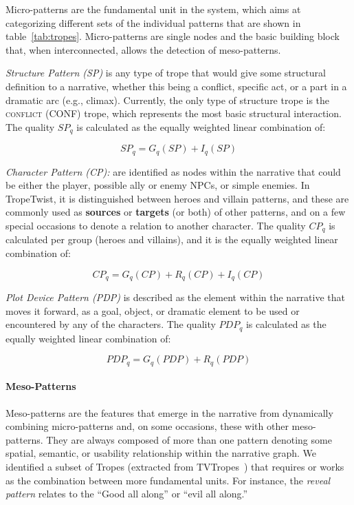 Micro-patterns are the fundamental unit in the system, which aims at categorizing different sets of the individual patterns that are shown in table~\ref{tab:tropes}. Micro-patterns are single nodes and the basic building block that, when interconnected, allows the detection of meso-patterns.

\emph{Structure Pattern (SP)} is any type of trope that would give some structural definition to a narrative, whether this being a conflict, specific act, or a part in a dramatic arc (e.g., climax). Currently, the only type of structure trope is the \textsc{conflict} (CONF) trope, which represents the most basic structural interaction. The quality $SP_{q}$ is calculated as the equally weighted linear combination of:

\begin{equation}
    SP_{q} = G_{q}(SP) + I_{q}(SP)
\end{equation}

\emph{Character Pattern (CP):} are identified as nodes within the narrative that could be either the player, possible ally or enemy NPCs, or simple enemies. In TropeTwist, it is distinguished between heroes and villain patterns, and these are commonly used as \textbf{sources} or \textbf{targets} (or both) of other patterns, and on a few special occasions to denote a relation to another character. The quality $CP_{q}$ is calculated per group (heroes and villains), and it is the equally weighted linear combination of:

\begin{equation}
    CP_{q} = G_{q}(CP) + R_{q}(CP) + I_{q}(CP)
\end{equation}

\emph{Plot Device Pattern (PDP)} is described as the element within the narrative that moves it forward, as a goal, object, or dramatic element to be used or encountered by any of the characters. The quality $PDP_{q}$ is calculated as the equally weighted linear combination of:

\begin{equation}
    PDP_{q} = G_{q}(PDP) + R_{q}(PDP)
\end{equation}


\paragraph{Meso-Patterns}
Meso-patterns are the features that emerge in the narrative from dynamically combining micro-patterns and, on some occasions, these with other meso-patterns. They are always composed of more than one pattern denoting some spatial, semantic, or usability relationship within the narrative graph. We identified a subset of Tropes (extracted from TVTropes~) that requires or works as the combination between more fundamental units. For instance, the \textit{reveal pattern} relates to the ``Good all along'' or ``evil all along.''

